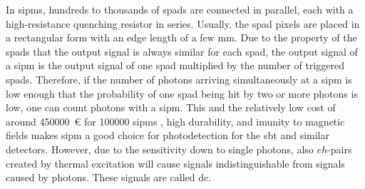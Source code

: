 In \acp{sipm}, hundreds to thousands of \acp{spad} are connected in parallel, each with a high-resistance quenching resistor in series. 
Usually, the \ac{spad} pixels are placed in a rectangular form with an edge length of a few \si{\milli\meter}.
Due to the property of the \acp{spad} that the output signal is always similar for each \ac{spad}, the output signal of a \ac{sipm} is the output signal of one \ac{spad} multiplied by the number of triggered \acp{spad}.
Therefore, if the number of photons arriving simultaneously at a \ac{sipm} is low enough that the probability of one \ac{spad} being hit by two or more photons is low, one can count photons with a \ac{sipm}.
This and the relatively low cost of around \SI{450000}{\euro} for \num{100000} \acp{sipm} , high durability, and imunity to magnetic fields makes \ac{sipm} a good choice for photodetection for the \ac{sbt} and similar detectors.
However, due to the sensitivity down to single photons, also $eh$-pairs created by thermal excitation will cause signals indistinguishable from signals caused by photons.
These signals are called \ac{dc}.






